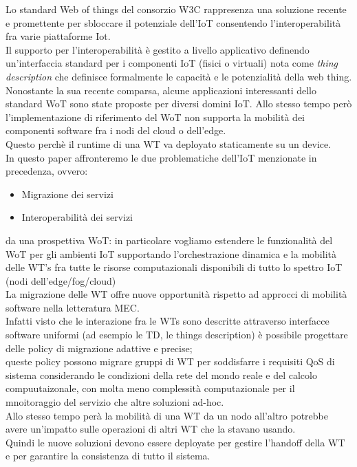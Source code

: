 \documentclass[11pt]{article}
\begin{document}
  
  Lo standard Web of things del consorzio W3C rappresenza una soluzione recente e promettente per sbloccare il potenziale dell'IoT consentendo l'interoperabilità fra varie piattaforme Iot.
  \\
  Il supporto per l'interoperabilità è gestito a livello applicativo definendo un'interfaccia standard per i componenti IoT (fisici o virtuali) nota come \textit{thing description} che definisce formalmente le capacità e le potenzialità della web thing. \\
  Nonostante la sua recente comparsa, alcune applicazioni interessanti dello standard WoT sono state proposte per diversi domini IoT.
  Allo stesso tempo però l'implementazione di riferimento del WoT non supporta la mobilità dei componenti software fra i nodi del cloud o dell'edge. \\
  Questo perchè il runtime di una WT va deployato staticamente su un device.
  \\
  In questo paper affronteremo le due problematiche dell'IoT menzionate in precedenza, ovvero:
  \begin{itemize}
  	\item Migrazione dei servizi
  	\item Interoperabilità dei servizi
  \end{itemize}
  da una prospettiva WoT: in particolare vogliamo estendere le funzionalità del WoT per gli ambienti IoT supportando l'orchestrazione dinamica e la mobilità delle WT's fra tutte le risorse computazionali disponibili di tutto lo spettro IoT (nodi dell'edge/fog/cloud) \\
  La migrazione delle WT offre nuove opportunità rispetto ad approcci di mobilità software nella letteratura MEC.
  \\
  Infatti visto che le interazione fra le WTs sono descritte attraverso interfacce software uniformi (ad esempio le TD, le things description) è possibile progettare delle policy di migrazione adattive e precise; \\
  queste policy possono migrare gruppi di WT per soddisfarre i requisiti QoS di sistema considerando le condizioni della rete del mondo reale e del calcolo compuutaizonale, con molta meno complessità computazionale per il mnoitoraggio del servizio che altre soluzioni ad-hoc. \\
  Allo stesso tempo perà la mobilità di una WT da un nodo all'altro potrebbe avere un'impatto sulle operazioni di altri WT che la stavano usando. \\
  Quindi le nuove soluzioni devono essere deployate per gestire l'handoff della WT e per garantire la consistenza di tutto il sistema.\\
\end{document}
